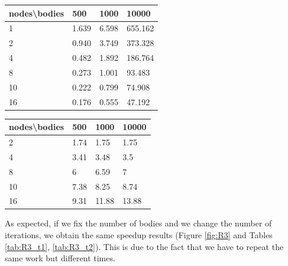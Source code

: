 \documentclass[a4paper]{article}
\begin{document}
\begin{minipage}[b]{.40\textwidth}
  \centering
  \begin{tabular}{l|l|l|l}
  \centering
nodes\textbackslash bodies & 500 & 1000 & 10000 \\ \hline
1 & 1.639 & 6.598 & 655.162 \\ \hline
2 & 0.940 & 3.749 & 373.328 \\ \hline
4 & 0.482 & 1.892 & 186.764 \\ \hline
8 & 0.273 & 1.001 & 93.483 \\ \hline
10 & 0.222 & 0.799 & 74.908 \\ \hline
16 & 0.176 & 0.555 & 47.192 \\ 
    \hline
  \end{tabular}
  \label{tab:R2_t1}
\end{minipage} \qquad
\begin{minipage}[b]{.40\textwidth}
  \centering
  \begin{tabular}{l|l|l|l}
nodes\textbackslash bodies & 500 & 1000 & 10000 \\ \hline
2 & 1.74 & 1.75 & 1.75 \\ \hline
4 & 3.41 & 3.48 & 3.5 \\ \hline
8 & 6 & 6.59 & 7 \\ \hline
10 & 7.38 & 8.25 & 8.74 \\ \hline
16 & 9.31 & 11.88 & 13.88 \\ 
  \hline
  \end{tabular}
  \label{tab:R2_t2}
\end{minipage}	


As expected, if we fix the number of bodies and we change the number of iterations, we obtain the same speedup results (Figure \ref{fig:R3} and Tables \ref{tab:R3_t1}, \ref{tab:R3_t2}). This is due to the fact that we have to repeat the same work but different times.
\end{document}
